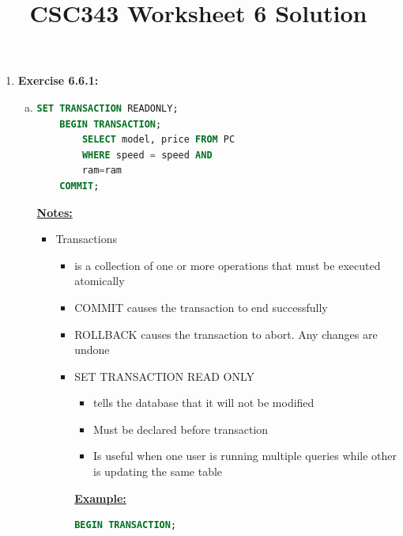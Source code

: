 \documentclass[12pt]{article}
\begin{document}
\title{CSC343 Worksheet 6 Solution}
\maketitle

\begin{enumerate}[1.]
    \item \textbf{Exercise 6.6.1:}

    \bigskip

    \begin{enumerate}[a)]
        \item

    \begin{lstlisting}[language=SQL]
    SET TRANSACTION READONLY;
    BEGIN TRANSACTION;
        SELECT model, price FROM PC
        WHERE speed = speed AND
        ram=ram
    COMMIT;
    \end{lstlisting}

        \bigskip

        \underline{\textbf{Notes:}}

        \bigskip

        \begin{itemize}
            \item Transactions
            \begin{itemize}
                \item is a collection of one or more operations that must be executed atomically
                \item COMMIT causes the transaction to end successfully
                \item ROLLBACK causes the transaction to abort. Any changes are undone
                \item SET TRANSACTION READ ONLY
                \begin{itemize}
                    \item tells the database that it will not be modified
                    \item Must be declared before transaction
                    \item Is useful when one user is running multiple queries while
                    other is updating the same table
                \end{itemize}
                \bigskip

                \underline{\textbf{Example:}}

    \begin{lstlisting}[language=SQL]
    BEGIN TRANSACTION;


\end{lstlisting}
\end{itemize}
\end{itemize}
\end{enumerate}
\end{enumerate}
\end{document}

